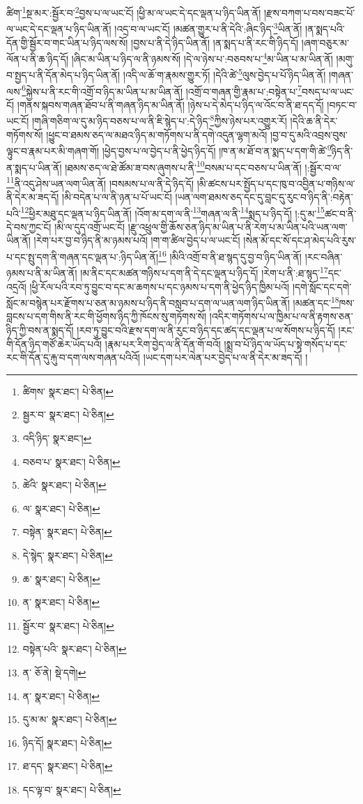 ཚིག་\footnote{ཚིགས་  སྣར་ཐང་།  པེ་ཅིན། }སྔ་མར་:སྦྱོར་བ་\footnote{སྦྱར་བ་  སྣར་ཐང་།  པེ་ཅིན། }བྱས་པ་ལ་ཡང་ངོ། །ཕྱི་མ་ལ་ཡང་དེ་དང་ལྡན་པ་ཉིད་ཡིན་ནོ། །རྫས་བཀག་པ་བས་བཟང་པོ་ལ་ཡང་དེ་དང་ལྡན་པ་ཉིད་ཡིན་ནོ། །འདྲ་བ་ལ་ཡང་ངོ། །མཚན་གྱུར་པ་ནི་དེའི་:ཞིང་ཉིད་\footnote{འདི་ཉིད་  སྣར་ཐང་། }ཡིན་ནོ། །ན་སྨད་པའི་དོན་གྱི་སྦྱོར་བ་གང་ཡིན་པ་ཉིད་ལས་སོ། །བྱས་པ་ནི་དེ་ཉིད་ཡིན་ནོ། །ན་སྨད་པ་ནི་རང་གི་ཉིད་དོ། །ཞག་བཅུར་མ་ལོན་པ་ནི་ཆ་ཉིད་དོ། །ཞིང་མ་ཡིན་པ་ཉིད་ལ་ནི་ཉམས་སོ། །དེ་ལ་ཉེས་པ་:བཅབས་པ་\footnote{བཅབ་པ་  སྣར་ཐང་།  པེ་ཅིན། }མ་ཡིན་པ་མ་ཡིན་ནོ། །མགུ་བ་སྤྱད་པ་ནི་དོན་མེད་པ་ཉིད་ཡིན་ནོ། །འདི་ལ་ཆོ་ག་རྣམས་གྱུར་ཏོ། །དེའི་ཚེ་\footnote{ཚེའི་  སྣར་ཐང་།  པེ་ཅིན། }ལུས་བྱེད་པ་པོ་ཉིད་ཡིན་ནོ། །གཞན་ལས་\footnote{ལ་  སྣར་ཐང་།  པེ་ཅིན། }སྐྱེས་པ་ནི་རང་གི་འགྲོ་བ་ཉིད་མ་ཡིན་པ་མ་ཡིན་ནོ། །འགྲོ་བ་གཞན་གྱི་རྣམ་པ་:བསྟེན་པ་\footnote{བསྟེན་  སྣར་ཐང་།  པེ་ཅིན། }བསད་པ་ལ་ཡང་ངོ། །གནས་སྐབས་གཞན་ཐོབ་པ་ནི་གཞན་ཉིད་མ་ཡིན་ནོ། །ཉེས་པ་དེ་མེད་པ་ཉིད་ལ་འོང་བ་ནི་ཐ་དད་དོ། །བཏང་བ་ཡང་ངོ། །གཞི་གཅིག་ལ་དུ་མ་ཉིད་བཅས་པ་ལ་ནི་ཇི་སྙེད་པ་:དེ་ཉིད་\footnote{དེ་སྙེད་  སྣར་ཐང་།  པེ་ཅིན། }ཀྱིས་ཉེས་པར་འགྱུར་རོ། །དེའི་ཆ་ནི་དེར་གཏོགས་སོ། །ཕྱུང་བ་ཐམས་ཅད་ལ་མཐའ་ཉིད་མ་གཏོགས་པ་ནི་དགེ་འདུན་ལྷག་མའོ། །བྱ་བ་དུ་མའི་འབྲས་བུས་ལྟུང་བ་རྣམ་པར་མི་གཞག་གོ། །ཕྱེད་བྱས་པ་ལ་བྱེད་པ་ནི་ཕྱེད་ཉིད་དོ། །ཁ་ན་མ་ཐོ་བ་ན་སྨད་པ་དག་གི་ཚེ་\footnote{ཆ་  སྣར་ཐང་།  པེ་ཅིན། }ཉིད་ནི་ན་སྨད་པ་ཡིན་ནོ། །ཐམས་ཅད་ལ་ཐེ་ཚོམ་ཟ་བས་ཞུགས་པ་ནི་\footnote{ན་  སྣར་ཐང་།  པེ་ཅིན། }བསམ་པ་དང་བཅས་པ་ཡིན་ནོ། །:སྦྱོར་བ་ལ་\footnote{སྦྱོར་བ་  སྣར་ཐང་།  པེ་ཅིན། }ནི་འདུ་ཤེས་ཡན་ལག་ཡིན་ནོ། །བསམས་པ་ལ་ནི་དེ་ཉིད་དོ། །མི་ཚངས་པར་སྤྱོད་པ་དང་ཁུ་བ་འབྱིན་པ་གཉིས་ལ་ནི་དེར་མ་ཟད་དོ། །མི་བདེན་པ་ལ་ནི་ཉན་པ་པོ་ཡང་ངོ། །ཡན་ལག་ཐམས་ཅད་དང་དུ་བླང་དུ་རུང་བ་ཉིད་ནི་:བརྟེན་པའི་\footnote{བསྟེན་པའི་  སྣར་ཐང་།  པེ་ཅིན། }ཕྱིར་མཐུ་དང་ལྡན་པ་ཉིད་ཡིན་ནོ། །འོག་མ་དག་ལ་ནི་\footnote{ན་  ཅོ་ནེ།  སྡེ་དགེ། }གཞན་ལ་ནི་\footnote{ན་  སྣར་ཐང་།  པེ་ཅིན། }སྨད་པ་ཉིད་དོ། །:དུ་མ་\footnote{དུ་མ་མ་  སྣར་ཐང་།  པེ་ཅིན། }ཚང་བ་ནི་དེ་བས་ཀྱང་ངོ། །མི་ལ་དུད་འགྲོ་ཡང་ངོ། །རྫུ་འཕྲུལ་གྱི་ཆོས་ཅན་ཉིད་མ་ཡིན་པ་ནི་རེག་པ་མ་ཡིན་པའི་ཡན་ལག་ཡིན་ནོ། །རེག་པར་བྱ་བ་ཉིད་ནི་མ་ཉམས་པའོ། །ག་ག་ཚིལ་བྱེད་པ་ལ་ཡང་ངོ། །སེན་མོ་དང་སོ་དང་ཤ་མེད་པའི་རུས་པ་དང་སྤུ་དག་ནི་གཞན་དང་ལྡན་པ་:ཉིད་ཡིན་ནོ།\footnote{ཉིད་དོ།  སྣར་ཐང་།  པེ་ཅིན། } །མིའི་འགྲོ་བ་ནི་ཐ་སྙད་དུ་བྱ་བ་ཉིད་ཡིན་ནོ། །རང་བཞིན་ཉམས་པ་ནི་མ་ཡིན་ནོ། །མ་ནིང་དང་མཚན་གཉིས་པ་དག་ནི་དེ་དང་ལྡན་པ་ཉིད་དོ། །རེག་པ་ནི་:ཐ་སྙད་\footnote{ཐ་དད་  སྣར་ཐང་།  པེ་ཅིན། }དང་འདྲའོ། །ཕྱི་རོལ་པའི་རབ་ཏུ་བྱུང་བ་དང་མ་ཆགས་པ་དང་ཉམས་པ་དག་ནི་ཕྱེད་ཉིད་ཁྱིམ་པའོ། །དགེ་སློང་དང་དགེ་སློང་མ་བསྙེན་པར་རྫོགས་པ་ཅན་མ་ཉམས་པ་ཉིད་ནི་བསླབ་པ་དག་ལ་ཡན་ལག་ཉིད་ཡིན་ནོ། །མཚན་དང་\footnote{དང་ལྟ་བ་  སྣར་ཐང་།  པེ་ཅིན། }ཁས་བླངས་པ་དག་གིས་ནི་རང་གི་ཕྱོགས་ཉིད་ཀྱི་ཁོངས་སུ་གཏོགས་སོ། །འདིར་གཏོགས་པ་ལ་ཁྱིམ་པ་ལ་ནི་རྟགས་ཅན་ཉིད་ཀྱི་བས་ན་སྨད་དོ། །རབ་ཏུ་བྱུང་བའི་རྫས་དག་ལ་ནི་རུང་བ་ཉིད་དང་ཚད་དང་ལྡན་པ་ལ་སོགས་པ་ཉིད་དོ། །རང་གི་དོན་ཉིད་གཙོ་ཆེར་ཡོད་པའོ། །རྣམ་པར་རིག་བྱེད་ལ་ནི་དོན་གོ་བའོ། །སྨྲ་བ་པོ་ཉིད་ལ་ཡོད་པ་སྟེ་གསོད་པ་དང་རང་གི་དོན་དུ་རྐུ་བ་དག་ལས་གཞན་པའིའོ། །ཡང་དག་པར་ལེན་པར་བྱེད་པ་ལ་ནི་དེར་མ་ཟད་དོ། །
